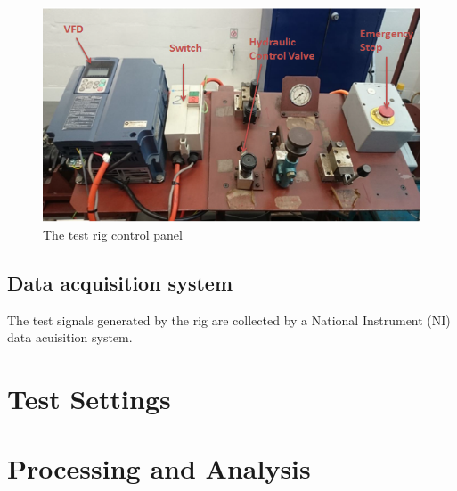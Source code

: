 \begin{figure}
	\centering
	\includegraphics{control}
	\caption{The test rig control panel}
	\label{control panel}
\end{figure}

\subsection{Data acquisition system}

The test signals generated by the rig are collected by a National Instrument (NI) data acuisition system. 



\section{Test Settings}







\section{Processing and Analysis}